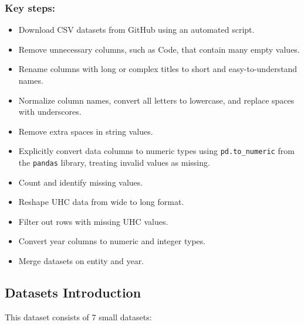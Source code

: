\subsubsection{Key steps:}
\begin{itemize}
    \item Download CSV datasets from GitHub using an automated script.
    \item Remove unnecessary columns, such as Code, that contain many empty values.
    \item Rename columns with long or complex titles to short and easy-to-understand names.
    \item Normalize column names, convert all letters to lowercase, and replace spaces with underscores.
    \item Remove extra spaces in string values.
    \item Explicitly convert data columns to numeric types using \texttt{pd.to\_numeric} from the \texttt{pandas} library, treating invalid values as missing.
    \item Count and identify missing values.
    \item Reshape UHC data from wide to long format.
    \item Filter out rows with missing UHC values.
    \item Convert year columns to numeric and integer types.
    \item Merge datasets on entity and year.
\end{itemize}

\subsection{Datasets Introduction}

This dataset consists of 7 small datasets:

